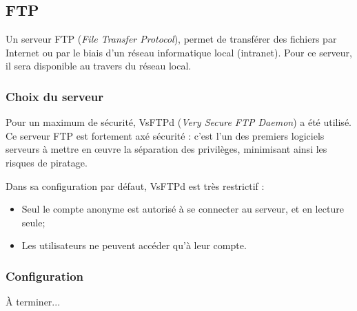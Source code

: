 \subsection{FTP}
\label{subsec:ftp}

Un serveur FTP (\emph{File Transfer Protocol}), permet de transférer des
fichiers par Internet ou par le biais d'un réseau informatique local
(intranet). Pour ce serveur, il sera disponible au travers du réseau local.

\subsubsection{Choix du serveur}
\label{subsubsec:choix-serveur}

Pour un maximum de sécurité, VsFTPd (\emph{Very Secure FTP Daemon}) a été utilisé. \\
Ce serveur FTP est fortement axé sécurité : c'est l'un des premiers logiciels
serveurs à mettre en \oe{}uvre la séparation des privilèges, minimisant ainsi les
risques de piratage.

Dans sa configuration par défaut, VsFTPd est très restrictif :

\begin{itemize}
    \item Seul le compte anonyme est autorisé à se connecter au serveur, et en
      lecture seule;

    \item Les utilisateurs ne peuvent accéder qu'à leur compte.
\end{itemize}

\subsubsection{Configuration}
\label{subsubsec:config}

À terminer...

